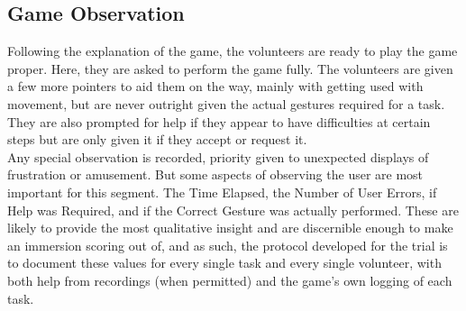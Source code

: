     \subsection{Game Observation} \label{sec:develop_trials_game}
    Following the explanation of the game, the volunteers are ready to play the game proper. Here, they are asked to perform the game fully. The volunteers are given a few more pointers to aid them on the way, mainly with getting used with movement, but are never outright given the actual gestures required for a task. They are also prompted for help if they appear to have difficulties at certain steps but are only given it if they accept or request it.\\
    Any special observation is recorded, priority given to unexpected displays of frustration or amusement. But some aspects of observing the user are most important for this segment. The Time Elapsed, the Number of User Errors, if Help was Required, and if the Correct Gesture was actually performed. These are likely to provide the most qualitative insight and are discernible enough to make an immersion scoring out of, and as such, the protocol developed for the trial is to document these values for every single task and every single volunteer, with both help from recordings (when permitted) and the game’s own logging of each task.\\


